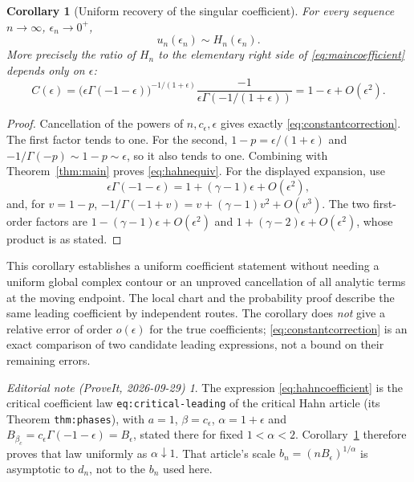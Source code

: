 \documentclass[11pt,a4paper]{article}
\numberwithin{equation}{section}
\newtheorem{corollary}[theorem]{Corollary}
\theoremstyle{definition}
\theoremstyle{remark}
\newtheorem*{ednote}{Editorial note (ProveIt, 2026-09-29)}
\newcommand{\ee}{\epsilon}
\begin{document}
\begin{corollary}[Uniform recovery of the singular coefficient]
\label{cor:hahncoefficient}
For every sequence $n\to\infty$, $\ee_n\to0^+$,
\begin{equation}\label{eq:hahnequiv}
 u_n(\ee_n)\sim H_n(\ee_n).
\end{equation}
More precisely the ratio of $H_n$ to the elementary right side of
\eqref{eq:maincoefficient} depends only on $\ee$:
\begin{equation}\label{eq:constantcorrection}
 C(\ee)=
 \bigl(\ee\Gamma(-1-\ee)\bigr)^{-1/(1+\ee)}
 \frac{-1}{\ee\Gamma(-1/(1+\ee))}
 =1-\ee+O(\ee^2).
\end{equation}
\end{corollary}
\begin{proof}
Cancellation of the powers of $n,c_\ee,\ee$ gives exactly
\eqref{eq:constantcorrection}. The first factor tends to one.
For the second, $1-p=\ee/(1+\ee)$ and
$-1/\Gamma(-p)\sim1-p\sim\ee$, so it also tends to one.
Combining with Theorem~\ref{thm:main} proves \eqref{eq:hahnequiv}.
For the displayed expansion, use
\[
 \ee\Gamma(-1-\ee)=1+(\gamma-1)\ee+O(\ee^2),
\]
and, for $v=1-p$, $-1/\Gamma(-1+v)=v+(\gamma-1)v^2+O(v^3)$.
The two first-order factors are
$1-(\gamma-1)\ee+O(\ee^2)$ and
$1+(\gamma-2)\ee+O(\ee^2)$, whose product is as stated.
\end{proof}

This corollary establishes a uniform coefficient statement without needing
a uniform global complex contour or an unproved cancellation of all
analytic terms at the moving endpoint. The local chart and the probability
proof describe the same leading coefficient by independent routes. The
corollary does \emph{not} give a relative error of order $o(\ee)$ for the
true coefficients; \eqref{eq:constantcorrection} is an exact comparison of
two candidate leading expressions, not a bound on their remaining errors.
\begin{ednote}
The expression \eqref{eq:hahncoefficient} is the critical coefficient law
\texttt{eq:critical-leading} of the critical Hahn article
\cite{repo-critical} (its Theorem \texttt{thm:phases}), with $a=1$,
$\beta=c_\ee$, $\alpha=1+\ee$ and $B_{\beta_c}=c_\ee\Gamma(-1-\ee)=B_\ee$,
stated there for fixed $1<\alpha<2$. Corollary~\ref{cor:hahncoefficient}
therefore proves that law uniformly as $\alpha\downarrow1$. That article's
scale $b_n=(nB_\ee)^{1/\alpha}$ is asymptotic to $d_n$, not to the $b_n$
used here.
\end{ednote}
\end{document}
